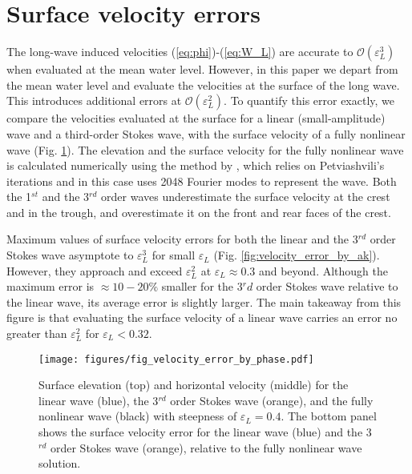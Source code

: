 \documentclass[lineno]{jfm}
\begin{document}


\appendix

\section{Surface velocity errors}
\label{appendix:surface_velocity_errors}

The long-wave induced velocities (\ref{eq:phi})-(\ref{eq:W_L}) are accurate to
$\mathcal{O}(\varepsilon_L^3)$ when evaluated at the mean water level.
However, in this paper we depart from the mean water level and evaluate the
velocities at the surface of the long wave.
This introduces additional errors at $\mathcal{O}(\varepsilon_L^2)$.
To quantify this error exactly, we compare the velocities evaluated at the
surface for a linear (small-amplitude) wave and a third-order Stokes wave,
with the surface velocity of a fully nonlinear wave
(Fig. \ref{fig:velocity_error_by_phase}).
The elevation and the surface velocity for the fully nonlinear wave is
calculated numerically using the method by \citet{clamond2018accurate},
which relies on Petviashvili's iterations and in this case uses 2048 Fourier
modes to represent the wave.
Both the 1$^{st}$ and the 3$^{rd}$ order waves underestimate the surface velocity
at the crest and in the trough, and overestimate it on the front and rear faces
of the crest.

Maximum values of surface velocity errors for both the linear and the
3$^{rd}$ order Stokes wave asymptote to $\varepsilon_L^3$ for small
$\varepsilon_L$ (Fig. \ref{fig:velocity_error_by_ak}).
However, they approach and exceed $\varepsilon_L^2$ at $\varepsilon_L \approx 0.3$
and beyond.
Although the maximum error is $\approx 10-20\%$ smaller for the 3$^rd$ order
Stokes wave relative to the linear wave, its average error is slightly larger.
The main takeaway from this figure is that evaluating the surface velocity
of a linear wave carries an error no greater than $\varepsilon_L^2$ for
$\varepsilon_L < 0.32$.

\begin{figure}
\centering
\texttt{[image: figures/fig\_velocity\_error\_by\_phase.pdf]}
\caption{
  Surface elevation (top) and horizontal velocity (middle) for the linear wave
  (blue), the 3$^{rd}$ order Stokes wave (orange), and the fully nonlinear wave
  (black) with steepness of $\varepsilon_L = 0.4$.
  The bottom panel shows the surface velocity error for the linear wave (blue)
  and the 3$^{rd}$ order Stokes wave (orange), relative to the fully nonlinear
  wave solution.
}
\label{fig:velocity_error_by_phase}
\end{figure}
\end{document}
